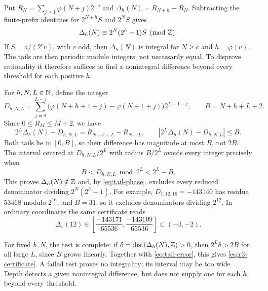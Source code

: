 \documentclass[11pt]{article}
\begin{document}
Put $R_N=\sum_{j\ge1}\varphi(N+j)2^{-j}$ and
$\Delta_h(N)=R_{N+h}-R_N$. Subtracting the finite-prefix identities
for $2^{N+h}S$ and $2^NS$ gives
\begin{equation}\label{eq:tail-phase}
 \Delta_h(N)\equiv2^N(2^h-1)S\pmod\Z.
\end{equation}
If $S=a/(2^cv)$, with $v$ odd, then $\Delta_h(N)$ is integral for
$N\ge c$ and $h=\varphi(v)$. The tails are then periodic modulo
integers, not necessarily equal. To disprove rationality it therefore
suffices to find a nonintegral difference beyond every threshold for
each positive $h$.

For $h,N,L\in\mathbb{N}$, define the integer
\[
 D_{h,N,L}=\sum_{j=0}^{L-1}
   \bigl(\varphi(N+h+1+j)-\varphi(N+1+j)\bigr)2^{L-1-j},
 \qquad B=N+h+L+2.
\]
Since $0\le R_M\le M+2$, we have
\begin{equation}\label{eq:tail-error}
 2^L\Delta_h(N)-D_{h,N,L}=R_{N+h+L}-R_{N+L},\qquad
 |2^L\Delta_h(N)-D_{h,N,L}|\le B.
\end{equation}
Both tails lie in $[0,B]$, so their difference has magnitude at most
$B$, not $2B$. The interval centred at $D_{h,N,L}/2^L$ with radius
$B/2^L$ avoids every integer precisely when
\begin{equation}\label{eq:r3-certificate}
 B<D_{h,N,L}\bmod2^L<2^L-B.
\end{equation}
This proves $\Delta_h(N)\notin\mathbb{Z}$ and, by \eqref{eq:tail-phase},
excludes every reduced denominator dividing $2^N(2^h-1)$.
For example, $D_{1,12,16}=-143140$ has residue $53468$ modulo $2^{16}$,
and $B=31$, so it excludes denominators dividing $2^{12}$.
In ordinary coordinates the same certificate reads
\[
 \Delta_1(12)\in
 \left[\frac{-143171}{65536},\frac{-143109}{65536}\right]
 \subset(-3,-2).
\]

For fixed $h,N$, the test is complete: if
$\delta=\operatorname{dist}(\Delta_h(N),\mathbb{Z})>0$, then
$2^L\delta>2B$ for all large $L$, since $B$ grows linearly.
Together with \eqref{eq:tail-error}, this gives \eqref{eq:r3-certificate}.
A failed test proves no integrality; its interval may be too wide.
Depth detects a given nonintegral difference, but does not supply one
for each $h$ beyond every threshold.
\end{document}
